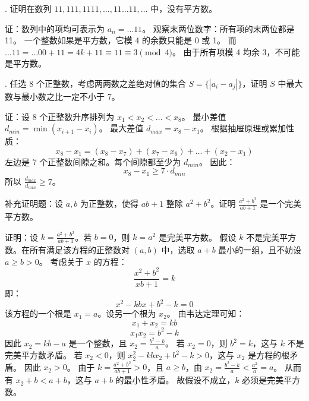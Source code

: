 \begin{questions}
. 证明在数列 $11, 111, 1111, \dots, 11\dots11, \dots$ 中，没有平方数。

\begin{solution}
证：数列中的项均可表示为 $a_n = \dots 11$。
观察末两位数字：所有项的末两位都是 11。
一个整数如果是平方数，它模 4 的余数只能是 0 或 1。
而 $\dots 11 = \dots 00 + 11 = 4k + 11 \equiv 11 \equiv 3 \pmod 4$。
由于所有项模 4 均余 3，不可能是平方数。
\end{solution}

. 任选 8 个正整数，考虑两两数之差绝对值的集合 $S = \{ |a_i - a_j| \}$，证明 $S$ 中最大数与最小数之比一定不小于 7。

\begin{solution}
证：设 8 个正整数升序排列为 $x_1 < x_2 < \dots < x_8$。
最小差值 $d_{min} = \min(x_{i+1} - x_i)$。
最大差值 $d_{max} = x_8 - x_1$。
根据抽屉原理或累加性质：
\[
x_8 - x_1 = (x_8 - x_7) + (x_7 - x_6) + \dots + (x_2 - x_1)
\]
左边是 7 个正整数间隙之和。每个间隙都至少为 $d_{min}$。
因此：
\[
x_8 - x_1 \geq 7 \cdot d_{min}
\]
所以 $\frac{d_{max}}{d_{min}} \geq 7$。
\end{solution}

\question 补充证明题：设 $a, b$ 为正整数，使得 $ab + 1$ 整除 $a^2 + b^2$。证明 $\frac{a^2 + b^2}{ab + 1}$ 是一个完美平方数。

\begin{solution}
证明：设 $k = \frac{a^2 + b^2}{ab + 1}$。若 $b = 0$，则 $k = a^2$ 是完美平方数。
假设 $k$ 不是完美平方数。在所有满足该方程的正整数对 $(a, b)$ 中，选取 $a + b$ 最小的一组，且不妨设 $a \geq b > 0$。
考虑关于 $x$ 的方程：
\[
\frac{x^2 + b^2}{xb + 1} = k
\]
即：
\[
x^2 - kbx + b^2 - k = 0
\]
该方程的一个根是 $x_1 = a$。设另一个根为 $x_2$。
由韦达定理可知：
\[
x_1 + x_2 = kb
\]
\[
x_1 x_2 = b^2 - k
\]
因此 $x_2 = kb - a$ 是一个整数，且 $x_2 = \frac{b^2 - k}{a}$。
若 $x_2 = 0$，则 $b^2 = k$，这与 $k$ 不是完美平方数矛盾。
若 $x_2 < 0$，则 $x_2^2 - kbx_2 + b^2 - k > 0$，这与 $x_2$ 是方程的根矛盾。
因此 $x_2 > 0$。
由于 $k = \frac{a^2 + b^2}{ab + 1} > 0$，且 $a \geq b$，由 $x_2 = \frac{b^2 - k}{a} < \frac{a^2}{a} = a$。
从而有 $x_2 + b < a + b$，这与 $a + b$ 的最小性矛盾。
故假设不成立，$k$ 必须是完美平方数。
\end{solution}

\question
{}
\end{questions}
